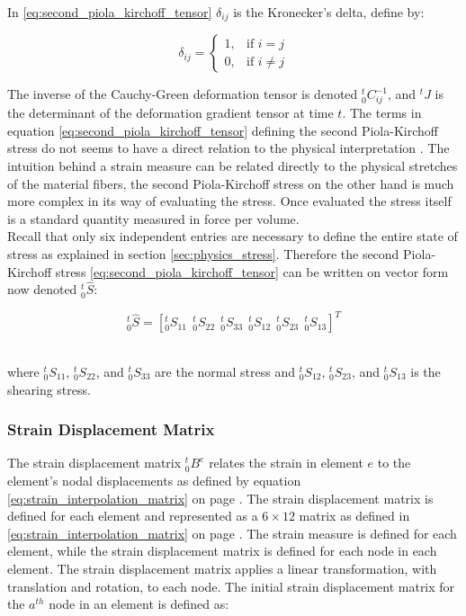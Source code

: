 In \eqref{eq:second_piola_kirchoff_tensor} $\delta_{ij}$ is the
Kronecker's delta, define by:

\begin{equation}
  \delta_{ij} = \left\{\begin{matrix} 1, & \mbox{if } i=j \\ 0, &
      \mbox{if } i \ne j \end{matrix}\right. 
\end{equation}

The inverse of the Cauchy-Green deformation tensor is denoted
$^t_0C_{ij}^{-1}$, and $^tJ$ is the determinant of the
deformation gradient tensor at time $t$.
%
The terms in equation \eqref{eq:second_piola_kirchoff_tensor} defining
the second Piola-Kirchoff stress do not seems to have a 
direct relation to the physical interpretation
. The intuition behind a strain
measure can be related directly to the physical stretches of the
material fibers, the second Piola-Kirchoff stress on the other hand is
much more complex in its way of evaluating the stress. Once evaluated
the stress itself is a standard quantity measured in force per volume. \\

Recall that only six independent entries are necessary to define the
entire state of stress as explained in section
\vref{sec:physics_stress}. Therefore the second Piola-Kirchoff
stress \eqref{eq:second_piola_kirchoff_tensor} can be written on
vector form now denoted $^t_0\hat{S}$:

\begin{equation*}
\label{eq:stress_tensor_vector_form}
^t_0\hat{S} = [^t_0S_{11} \ \ ^t_0S_{22} \ \ ^t_0S_{33} \ \ 
^t_0S_{12} \ \ ^t_0S_{23} \ \ ^t_0S_{13}]^T
\end{equation*} \

where $^t_0S_{11}$, $^t_0S_{22}$, and $^t_0S_{33}$ are the normal
stress and $^t_0S_{12}$, $^t_0S_{23}$, and $^t_0S_{13}$ is the
shearing stress.

\subsubsection*{Strain Displacement Matrix}
The strain displacement matrix $^t_0B^{e}$ relates the strain in
element $e$ to the element's nodal displacements as defined by
equation \eqref{eq:strain_interpolation_matrix} on page
\pageref{eq:strain_interpolation_matrix}. 
The strain displacement 
matrix is defined for each element and represented as a $6 \times 12$
matrix as defined in \eqref{eq:strain_interpolation_matrix} on page
\pageref{eq:strain_interpolation_matrix}. 
%
The strain measure is defined for each element, while the strain
displacement matrix is defined for 
each node in each element. The strain displacement matrix applies a
linear transformation, with translation and rotation, to each node.
The initial strain displacement matrix for the $a^{th}$ node in an
element is defined as:

